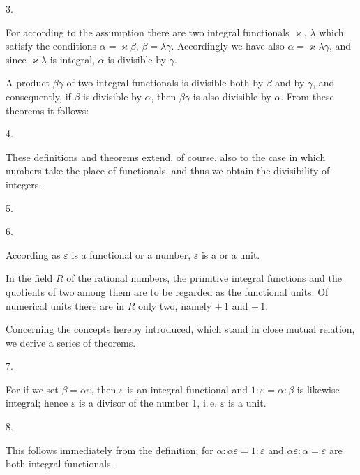 
3. 

For according to the assumption there are two integral functionals $\varkappa$,
$\lambda$ which satisfy the conditions $\alpha = \varkappa\beta$, $\beta = \lambda\gamma$.
Accordingly we have also $\alpha = \varkappa\lambda\gamma$, and since $\varkappa\lambda$
is integral, $\alpha$ is divisible by $\gamma$.

A product $\beta\gamma$ of two integral functionals is divisible both by $\beta$ and by
$\gamma$, and consequently, if $\beta$ is divisible by $\alpha$, then $\beta\gamma$ is
also divisible by $\alpha$. From these theorems it follows:

4. 

These definitions and theorems extend, of course, also to the case in which numbers
take the place of functionals, and thus we obtain the divisibility of
integers.

5. 

6. 

According as $\varepsilon$ is a functional or a number, $\varepsilon$ is a
 or a  unit.

In the field $R$ of the rational numbers, the primitive integral functions and the
quotients of two among them are to be regarded as the functional units. Of numerical
units there are in $R$ only two, namely $+\,1$ and $-\,1$.

Concerning the concepts hereby introduced, which stand in close mutual relation,
we derive a series of theorems.

7. 

For if we set $\beta = \alpha\varepsilon$, then $\varepsilon$ is an integral
functional and $1 : \varepsilon = \alpha : \beta$ is likewise integral; hence
$\varepsilon$ is a divisor of the number 1, i.\,e. $\varepsilon$ is a unit.

8. 

This follows immediately from the definition; for $\alpha : \alpha\varepsilon =
1 : \varepsilon$ and $\alpha\varepsilon : \alpha = \varepsilon$ are both integral
functionals.

